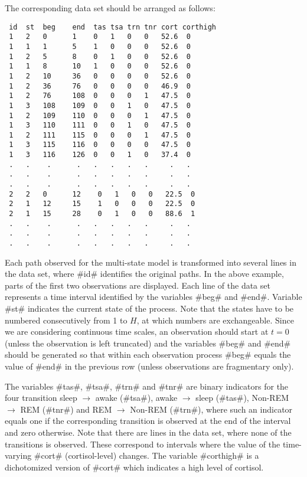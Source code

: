 The corresponding data set should be arranged as follows:

\begin{verbatim}
 id  st  beg    end  tas tsa trn tnr cort corthigh
 1   2   0      1    0   1   0   0   52.6  0
 1   1   1      5    1   0   0   0   52.6  0
 1   2   5      8    0   1   0   0   52.6  0
 1   1   8      10   1   0   0   0   52.6  0
 1   2   10     36   0   0   0   0   52.6  0
 1   2   36     76   0   0   0   0   46.9  0
 1   2   76     108  0   0   0   1   47.5  0
 1   3   108    109  0   0   1   0   47.5  0
 1   2   109    110  0   0   0   1   47.5  0
 1   3   110    111  0   0   1   0   47.5  0
 1   2   111    115  0   0   0   1   47.5  0
 1   3   115    116  0   0   0   0   47.5  0
 1   3   116    126  0   0   1   0   37.4  0
 .   .    .      .   .   .   .   .     .   .
 .   .    .      .   .   .   .   .     .   .
 .   .    .      .   .   .   .   .     .   .
 2   2   0      12    0   1   0   0   22.5  0
 2   1   12     15    1   0   0   0   22.5  0
 2   1   15     28    0   1   0   0   88.6  1
 .   .    .      .   .   .   .   .     .   .
 .   .    .      .   .   .   .   .     .   .
 .   .    .      .   .   .   .   .     .   .
\end{verbatim}

Each path observed for the multi-state model is transformed into
several lines in the data set, where #id# identifies the original
paths. In the above example, parts of the first two observations are
displayed. Each line of the data set represents a time interval
identified by the variables #beg# and #end#. Variable #st# indicates
the current state of the process. Note that the states have to be
numbered consecutively from 1 to $H$, at which numbers are
exchangeable. Since we are considering continuous time scales, an
observation should start at $t=0$ (unless the observation is left
truncated) and the variables #beg# and #end# should be generated so
that within each observation process #beg# equals the value of #end#
in the previous row (unless observations are fragmentary only).

The variables #tas#, #tsa#, #trn# and #tnr# are binary indicators
for the four transition sleep $\rightarrow$ awake (#tsa#), awake
$\rightarrow$ sleep (#tas#), Non-REM $\rightarrow$ REM (#tnr#) and
REM $\rightarrow$ Non-REM (#trn#), where such an indicator equals
one if the corresponding transition is observed at the end of the
interval and zero otherwise. Note that there are lines in the data
set, where none of the transitions is observed. These correspond to
intervals where the value of the time-varying #cort#
(cortisol-level) changes. The variable #corthigh# is a dichotomized
version of #cort# which indicates a high level of cortisol.

